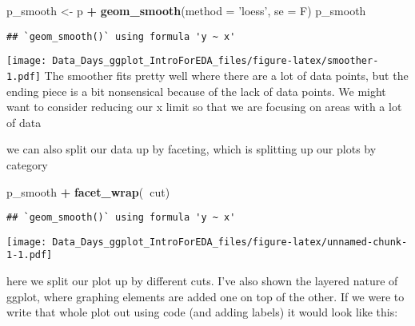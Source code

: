 \documentclass[
]{article}
\newenvironment{Shaded}{\begin{snugshade}}{\end{snugshade}}
\newcommand{\DataTypeTok}[1]{\textcolor[rgb]{0.13,0.29,0.53}{#1}}
\newcommand{\KeywordTok}[1]{\textcolor[rgb]{0.13,0.29,0.53}{\textbf{#1}}}
\newcommand{\NormalTok}[1]{#1}
\newcommand{\OperatorTok}[1]{\textcolor[rgb]{0.81,0.36,0.00}{\textbf{#1}}}
\newcommand{\StringTok}[1]{\textcolor[rgb]{0.31,0.60,0.02}{#1}}
\begin{document}
\begin{Shaded}
\begin{Highlighting}[]
\NormalTok{p_smooth <-}\StringTok{ }\NormalTok{p }\OperatorTok{+}\StringTok{ }\KeywordTok{geom_smooth}\NormalTok{(}\DataTypeTok{method =} \StringTok{'loess'}\NormalTok{, }\DataTypeTok{se =}\NormalTok{ F)}
\NormalTok{p_smooth}
\end{Highlighting}
\end{Shaded}

\begin{verbatim}
## `geom_smooth()` using formula 'y ~ x'
\end{verbatim}

\texttt{[image: Data\_Days\_ggplot\_IntroForEDA\_files/figure-latex/smoother-1.pdf]}
The smoother fits pretty well where there are a lot of data points, but
the ending piece is a bit nonsensical because of the lack of data
points. We might want to consider reducing our x limit so that we are
focusing on areas with a lot of data

we can also split our data up by faceting, which is splitting up our
plots by category

\begin{Shaded}
\begin{Highlighting}[]
\NormalTok{p_smooth }\OperatorTok{+}\StringTok{ }\KeywordTok{facet_wrap}\NormalTok{(}\OperatorTok{~}\NormalTok{cut)}
\end{Highlighting}
\end{Shaded}

\begin{verbatim}
## `geom_smooth()` using formula 'y ~ x'
\end{verbatim}

\texttt{[image: Data\_Days\_ggplot\_IntroForEDA\_files/figure-latex/unnamed-chunk-1-1.pdf]}

here we split our plot up by different cuts. I've also shown the layered
nature of ggplot, where graphing elements are added one on top of the
other. If we were to write that whole plot out using code (and adding
labels) it would look like this:
\end{document}
